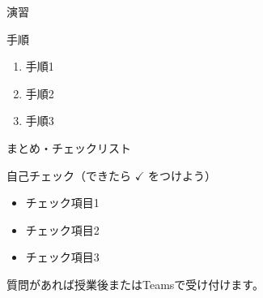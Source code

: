 \documentclass[aspectratio=43,professionalfonts,handout]{beamer}
\begin{document}

\begin{frame}{演習}

  \vfill

  \begin{block}{手順}
    \begin{enumerate}
      \item 手順1
      \item 手順2
      \item 手順3
    \end{enumerate}
  \end{block}
\end{frame}

%


\begin{frame}{まとめ・チェックリスト}
  \begin{block}{自己チェック（できたら $\checkmark$ をつけよう）}
    \begin{itemize}
      \item[$\square$] チェック項目1
      \item[$\square$] チェック項目2
      \item[$\square$] チェック項目3
    \end{itemize}
  \end{block}

  \vfill

  {\small 質問があれば授業後またはTeamsで受け付けます。}
\end{frame}
\end{document}
